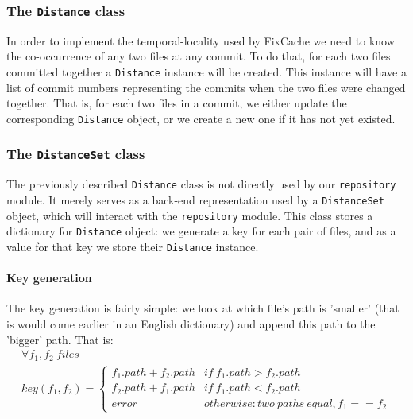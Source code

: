 \documentclass[12pt,twoside,notitlepage]{report}
\newcommand{\fxch}{FixCache }
\begin{document}
\subsubsection*{The \texttt{Distance} class}
In order to implement the temporal-locality used by \fxch we need to know the co-occurrence of any two files at any commit. To do that, for each two files committed together a \texttt{Distance} instance will be created. This instance will have a list of commit numbers representing the commits when the two files were changed together. That is, for each two files in a commit, we either update the corresponding \texttt{Distance} object, or we create a new one if it has not yet existed.
\subsubsection*{The \texttt{DistanceSet} class}
The previously described \texttt{Distance} class is not directly used by our \texttt{repository} module. It merely serves as a back-end representation used by a \texttt{DistanceSet} object, which will interact with the \texttt{repository} module. This class stores a dictionary for \texttt{Distance} object: we generate a key for each pair of files, and as a value for that key we store their \texttt{Distance} instance. 
\paragraph{Key generation} The key generation is fairly simple: we look at which file's path is 'smaller' (that is would come earlier in an English dictionary) and append this path to the 'bigger' path. That is:
\begin{gather*} 
	\forall f_1, f_2\ files \\
	key(f_1, f_2) = \begin{cases}
						f_1.path+f_2.path &if\ f_1.path > f_2.path\\
						f_2.path+f_1.path &if\ f_1.path < f_2.path\\
						error &otherwise: two\ paths\ equal, f_1 == f_2
					\end{cases}
\end{gather*}
\end{document}
